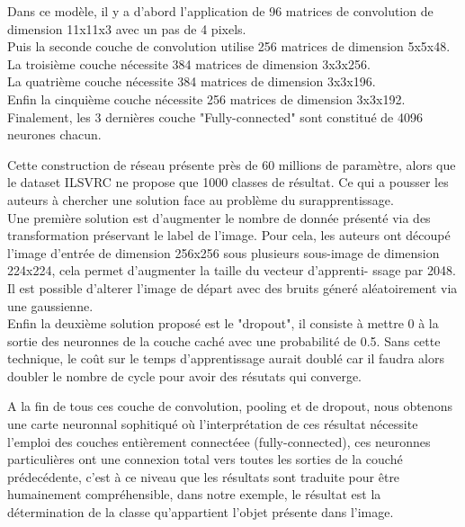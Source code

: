 \documentclass[12pt, letterpaper]{article}
\begin{document}
\par Dans ce modèle, il y a d'abord l'application de 96 matrices de convolution de dimension 11x11x3 avec un pas de 4 pixels. 
\\Puis la seconde couche de convolution utilise 256 matrices de dimension 5x5x48.
\\La troisième couche nécessite 384 matrices de dimension 3x3x256.
\\La quatrième couche nécessite 384 matrices de dimension 3x3x196.
\\Enfin la cinquième couche nécessite 256 matrices de dimension 3x3x192.
\\Finalement, les 3 dernières couche "Fully-connected" sont constitué de 4096 neurones chacun.

\par Cette construction de réseau présente près de 60 millions de paramètre, alors que le dataset ILSVRC ne propose que 1000 classes de résultat. 
Ce qui a pousser les auteurs à chercher une solution face au problème du surapprentissage.\\
Une première solution est d'augmenter le nombre de donnée présenté via des transformation préservant le label de l'image. 
Pour cela, les auteurs ont découpé l'image d'entrée de dimension 256x256 sous plusieurs sous-image de dimension 224x224, cela permet d'augmenter la taille 
du vecteur d'apprenti- ssage par 2048. Il est possible d'alterer l'image de départ avec des bruits géneré aléatoirement via une gaussienne.\\
Enfin la deuxième solution proposé est le "dropout", il consiste à mettre 0 à la sortie des neuronnes de la couche caché avec une probabilité de 0.5.
Sans cette technique, le coût sur le temps d'apprentissage aurait doublé car il faudra alors doubler le nombre de cycle pour avoir des résutats qui converge.

\par A la fin de tous ces couche de convolution, pooling et de dropout, nous obtenons une carte neuronnal sophitiqué où l'interprétation de ces résultat nécessite 
l'emploi des couches entièrement connectéee (fully-connected), ces neuronnes particulières ont une connexion total vers toutes les sorties de la couché prédecédente, 
c'est à ce niveau que les résultats sont traduite pour être humainement compréhensible, dans notre exemple, le résultat est la détermination de la classe qu'appartient 
l'objet présente dans l'image. 
\end{document}
